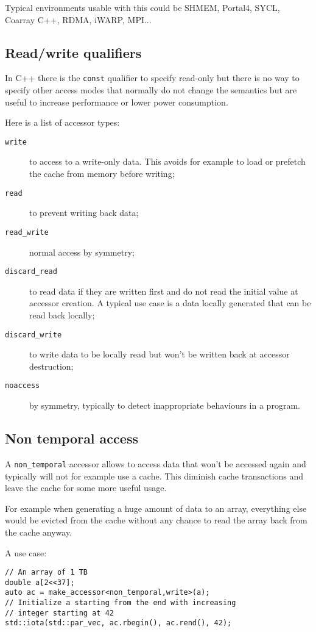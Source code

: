 \documentclass[a4paper]{article}
\begin{document}
Typical environments usable with this could be SHMEM, Portal4, SYCL,
Coarray C++, RDMA, iWARP, MPI...


\subsection{Read/write qualifiers}
\label{sec:readwrite-qualifiers}

In C++ there is the \lstinline|const| qualifier to specify read-only
but there is no way to specify other access modes that normally do not
change the semantics but are useful to increase performance or lower
power consumption.

Here is a list of accessor types:
\begin{description}
\item[\texttt{write}] to access to a write-only data. This avoids for
  example to load or prefetch the cache from memory before writing;
\item[\texttt{read}] to prevent writing back data;
\item[\texttt{read\_write}] normal access by symmetry;
\item[\texttt{discard\_read}] to read data if they are written first
  and do not read the initial value at accessor creation. A typical
  use case is a data locally generated that can be read back locally;
\item[\texttt{discard\_write}] to write data to be locally read but
  won't be written back at accessor destruction;
\item[\texttt{noaccess}] by symmetry, typically to detect
  inappropriate behaviours in a program.
\end{description}


\subsection{Non temporal access}
\label{sec:non-temporal-access}

A \lstinline|non_temporal| accessor allows to access data that won't
be accessed again and typically will not for example use a cache. This
diminish cache transactions and leave the cache for some more useful
usage.

For example when generating a huge amount of data to an array, everything else
would be evicted from the cache without any chance to read the array
back from the cache anyway.

A use case:
\begin{lstlisting}
// An array of 1 TB
double a[2<<37];
auto ac = make_accessor<non_temporal,write>(a);
// Initialize a starting from the end with increasing
// integer starting at 42
std::iota(std::par_vec, ac.rbegin(), ac.rend(), 42);
\end{lstlisting}%
\end{document}
